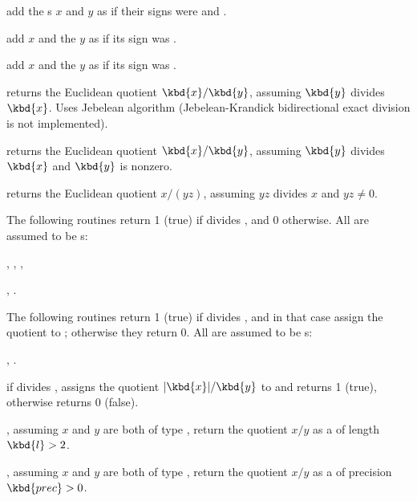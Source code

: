  add the s $x$
and $y$ as if their signs were  and .

 add $x$ and the  $y$
as if its sign was .

 add $x$ and the  $y$
as if its sign was .


 returns the Euclidean quotient
$\kbd{x} / \kbd{y}$, assuming $\kbd{y}$ divides $\kbd{x}$. Uses Jebelean
algorithm (Jebelean-Krandick bidirectional exact division is not
implemented).

 returns the Euclidean quotient
$\kbd{x} / \kbd{y}$, assuming $\kbd{y}$ divides
$\kbd{x}$ and $\kbd{y}$ is nonzero.

 returns the Euclidean
quotient $x/(yz)$, assuming $yz$ divides $x$ and $yz \neq 0$.

The following routines return 1 (true) if  divides , and
0 otherwise. All  are assumed to be s:

,
,
,

,
.

The following routines return 1 (true) if  divides , and in
that case assign the quotient to ; otherwise they return 0. All
 are assumed to be s:

,
.

 if  divides , assigns
the quotient $|\kbd{x}|/\kbd{y}$ to  and returns 1 (true), otherwise
returns 0 (false).


, assuming $x$ and $y$
are both of type , return the quotient $x/y$ as a  of
length $\kbd{l} > 2$.

, assuming $x$ and $y$
are both of type , return the quotient $x/y$ as a  of
precision $\kbd{prec} > 0$.

